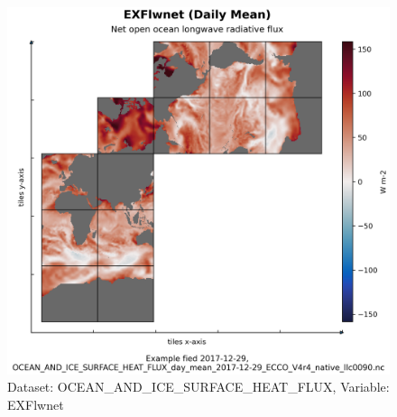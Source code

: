 \begin{figure}[H]
\centering
\includegraphics[scale=0.55]{../images/plots/native_plots/Ocean_and_Sea-Ice_Surface_Heat_Fluxes/EXFlwnet.png}
\caption{Dataset: OCEAN\_AND\_ICE\_SURFACE\_HEAT\_FLUX, Variable: EXFlwnet}
\label{tab:table-OCEAN_AND_ICE_SURFACE_HEAT_FLUX_EXFlwnet-Plot}
\end{figure}
\pagebreak

